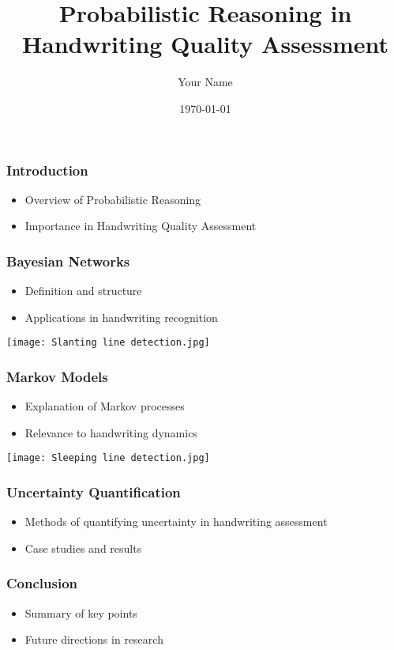 \documentclass{beamer}
\title{Probabilistic Reasoning in Handwriting Quality Assessment}
\author{Your Name}
\date{\today}
\begin{document}
\frame{\titlepage}

\begin{frame}
\frametitle{Introduction}
\begin{itemize}
    \item Overview of Probabilistic Reasoning
    \item Importance in Handwriting Quality Assessment
\end{itemize}
\end{frame}

\begin{frame}
\frametitle{Bayesian Networks}
\begin{itemize}
    \item Definition and structure
    \item Applications in handwriting recognition
\end{itemize}
\texttt{[image: Slanting line detection.jpg]}
\end{frame}

\begin{frame}
\frametitle{Markov Models}
\begin{itemize}
    \item Explanation of Markov processes
    \item Relevance to handwriting dynamics
\end{itemize}
\texttt{[image: Sleeping line detection.jpg]}
\end{frame}

\begin{frame}
\frametitle{Uncertainty Quantification}
\begin{itemize}
    \item Methods of quantifying uncertainty in handwriting assessment
    \item Case studies and results
\end{itemize}
\end{frame}

\begin{frame}
\frametitle{Conclusion}
\begin{itemize}
    \item Summary of key points
    \item Future directions in research
\end{itemize}
\end{frame}
\end{document}
